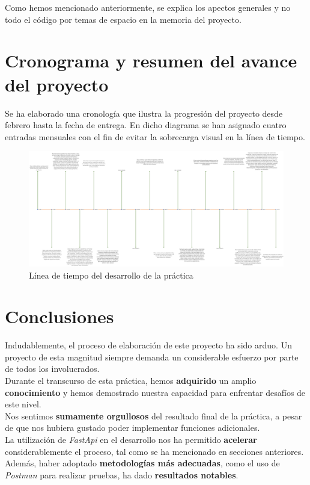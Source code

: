 \documentclass[12pt]{report}
\begin{document}
Como hemos mencionado anteriormente, se explica los apectos generales y no todo el código por temas de espacio en la memoria del proyecto.
\newpage
\chapter{Cronograma y resumen del avance del proyecto}
Se ha elaborado una cronología que ilustra la progresión del proyecto desde febrero hasta la fecha de entrega. En dicho diagrama se han asignado cuatro entradas mensuales con el fin de evitar la sobrecarga visual en la línea de tiempo.
\begin{landscape}
\begin{figure}[p]
    \centering
    \includegraphics[width=1\linewidth]{imagenes//diagramas/linea de tiempo v2.png}
    \caption{Línea de tiempo del desarrollo de la práctica}
    \label{fig:enter-label}
\end{figure}
\end{landscape}
\newpage
\chapter{Conclusiones}
Indudablemente, el proceso de elaboración de este proyecto ha sido arduo. Un proyecto de esta magnitud siempre demanda un considerable esfuerzo por parte de todos los involucrados.\\

Durante el transcurso de esta práctica, hemos \textbf{adquirido} un amplio \textbf{conocimiento} y hemos demostrado nuestra capacidad para enfrentar desafíos de este nivel.\\

Nos sentimos \textbf{sumamente orgullosos} del resultado final de la práctica, a pesar de que nos hubiera gustado poder implementar funciones adicionales.\\

La utilización de \textit{FastApi} en el desarrollo nos ha permitido \textbf{acelerar} considerablemente el proceso, tal como se ha mencionado en secciones anteriores. Además, haber adoptado \textbf{metodologías más adecuadas}, como el uso de \textit{Postman} para realizar pruebas, ha dado \textbf{resultados notables}.\\
\end{document}
